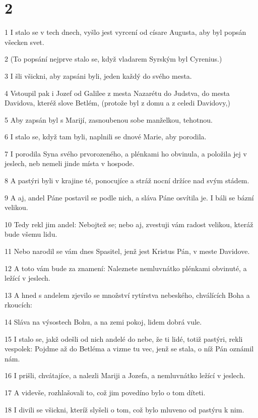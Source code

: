 \chapter{2}

\par 1 I stalo se v tech dnech, vyšlo jest vyrcení od císare Augusta, aby byl popsán všecken svet.
\par 2 (To popsání nejprve stalo se, když vladarem Syrským byl Cyrenius.)
\par 3 I šli všickni, aby zapsáni byli, jeden každý do svého mesta.
\par 4 Vstoupil pak i Jozef od Galilee z mesta Nazarétu do Judstva, do mesta Davidova, kteréž slove Betlém, (protože byl z domu a z celedi Davidovy,)
\par 5 Aby zapsán byl s Marijí, zasnoubenou sobe manželkou, tehotnou.
\par 6 I stalo se, když tam byli, naplnili se dnové Marie, aby porodila.
\par 7 I porodila Syna svého prvorozeného, a plénkami ho obvinula, a položila jej v jeslech, neb nemeli jinde místa v hospode.
\par 8 A pastýri byli v krajine té, ponocujíce a stráž nocní držíce nad svým stádem.
\par 9 A aj, andel Páne postavil se podle nich, a sláva Páne osvítila je. I báli se bázní velikou.
\par 10 Tedy rekl jim andel: Nebojtež se; nebo aj, zvestuji vám radost velikou, kteráž bude všemu lidu.
\par 11 Nebo narodil se vám dnes Spasitel, jenž jest Kristus Pán, v meste Davidove.
\par 12 A toto vám bude za znamení: Naleznete nemluvnátko plénkami obvinuté, a ležící v jeslech.
\par 13 A hned s andelem zjevilo se množství rytírstva nebeského, chválících Boha a rkoucích:
\par 14 Sláva na výsostech Bohu, a na zemi pokoj, lidem dobrá vule.
\par 15 I stalo se, jakž odešli od nich andelé do nebe, že ti lidé, totiž pastýri, rekli vespolek: Pojdme až do Betléma a vizme tu vec, jenž se stala, o níž Pán oznámil nám.
\par 16 I prišli, chvátajíce, a nalezli Mariji a Jozefa, a nemluvnátko ležící v jeslech.
\par 17 A videvše, rozhlašovali to, což jim povedíno bylo o tom díteti.
\par 18 I divili se všickni, kteríž slyšeli o tom, což bylo mluveno od pastýru k nim.
